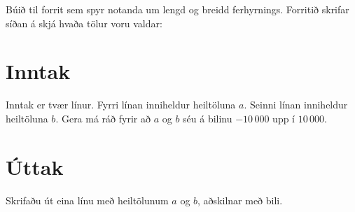 
Búið til forrit sem spyr notanda um lengd og breidd ferhyrnings. Forritið
skrifar síðan á skjá hvaða tölur voru valdar:

\section*{Inntak}
Inntak er tvær línur.
Fyrri línan inniheldur heiltöluna $a$.
Seinni línan inniheldur heiltöluna $b$.
Gera má ráð fyrir að $a$ og $b$ séu á bilinu $-10\,000$ upp í $10\,000$.

\section*{Úttak}
Skrifaðu út eina línu með heiltölunum $a$ og $b$, aðskilnar með bili.
